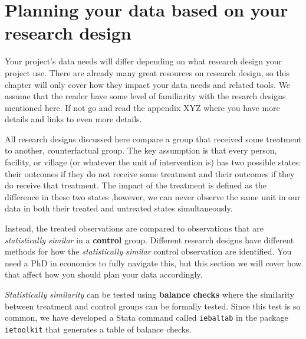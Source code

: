 


\section{Planning your data based on your research design}

Your project's data needs will differ depending on what research design your project use. 
There are already many great resources on research design,
so this chapter will only cover how they impact your data needs and related tools. 
We assume that the reader have some level of familiarity with the resarch designs mentioned here. 
If not go and read the appendix XYZ where you have more details and links to even more details.  

All research designs discussed here compare a group that received some treatment
to another, counterfactual group.
The key assumption is that every
person, facility, or village (or whatever the unit of intervention is)
has two possible states: their outcomes if they do not receive some treatment
and their outcomes if they do receive that treatment.
The impact of the treatment is defined as the difference in these two states
,however, we can never observe the same unit in our data
in both their treated and untreated states simultaneously.

Instead, the treated observations are compared to observations
that are \textit{statistically similar} in a \textbf{control} group. 
Different research designs have different methods 
for how the \textit{statistically similar} control observation are identified. 
You need a PhD in economics to fully navigate this, 
but this section we will cover how that affect how you should plan your data accordingly.

\textit{Statistically similarity} can be tested using \textbf{balance checks} 
where the similarity between treatment and control groups can be formally tested. 
Since this test is so common, 
we have developed a Stata command called \texttt{iebaltab}
in the package \texttt{ietoolkit} that generates a table of balance checks.


